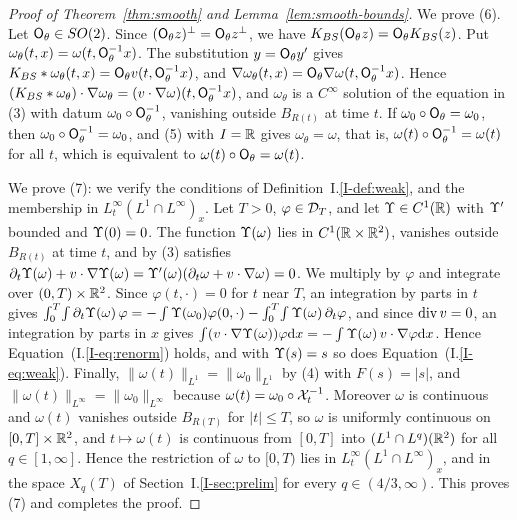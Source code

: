 \begin{proof}[Proof of Theorem~\ref{thm:smooth} and Lemma~\ref{lem:smooth-bounds}]
We prove (6). Let $\mathsf{O}_\theta\in SO(2)$. Since $(\mathsf{O}_\theta z)^\perp=\mathsf{O}_\theta z^\perp$,
we have $K_{BS}(\mathsf{O}_\theta z)=\mathsf{O}_\theta K_{BS}(z)$. Put
$\omega_\theta(t,x)=\omega(t,\mathsf{O}_\theta^{-1}x)$. The substitution
$y=\mathsf{O}_\theta y'$ gives
$K_{BS}\ast\omega_\theta(t,x)=\mathsf{O}_\theta v(t,\mathsf{O}_\theta^{-1}x)$, and
$\nabla\omega_\theta(t,x)=\mathsf{O}_\theta\nabla\omega(t,\mathsf{O}_\theta^{-1}x)$. Hence
$(K_{BS}\ast\omega_\theta)\cdot\nabla\omega_\theta=(v\cdot\nabla\omega)(t,\mathsf{O}_\theta^{-1}x)$,
and $\omega_\theta$ is a $C^\infty$ solution of the equation in (3) with datum
$\omega_0\circ\mathsf{O}_\theta^{-1}$, vanishing outside $B_{R(t)}$ at time $t$. If
$\omega_0\circ\mathsf{O}_\theta=\omega_0$, then $\omega_0\circ\mathsf{O}_\theta^{-1}=\omega_0$,
and (5) with $I=\mathbb{R}$ gives $\omega_\theta=\omega$, that is,
$\omega(t)\circ\mathsf{O}_\theta^{-1}=\omega(t)$ for all $t$, which is equivalent to
$\omega(t)\circ\mathsf{O}_\theta=\omega(t)$.

We prove (7): we verify the conditions of
Definition~I.\ref{I-def:weak}, and the membership in $L^\infty_t(L^1\cap L^\infty)_x$. Let $T>0$, $\varphi\in\mathcal{D}_T$, and let $\Upsilon\in C^1(\mathbb{R})$ with
$\Upsilon'$ bounded and $\Upsilon(0)=0$. The function $\Upsilon(\omega)$ lies in
$C^1(\mathbb{R}\times\mathbb{R}^2)$, vanishes outside $B_{R(t)}$ at time $t$, and by (3)
satisfies $\partial_t\Upsilon(\omega)+v\cdot\nabla\Upsilon(\omega)=\Upsilon'(\omega)(\partial_t\omega+v\cdot\nabla\omega)=0$.
We multiply by $\varphi$ and integrate over $(0,T)\times\mathbb{R}^2$. Since
$\varphi(t,\cdot)=0$ for $t$ near $T$, an integration by parts in $t$ gives
$\int_0^T\!\int\partial_t\Upsilon(\omega)\,\varphi=-\int\Upsilon(\omega_0)\varphi(0,\cdot)-\int_0^T\!\int\Upsilon(\omega)\,\partial_t\varphi$,
and since $\operatorname{div} v=0$, an integration by parts in $x$ gives
$\int(v\cdot\nabla\Upsilon(\omega))\varphi\dd x=-\int\Upsilon(\omega)\,v\cdot\nabla\varphi\dd x$.
Hence Equation~(I.\ref{I-eq:renorm}) holds, and with $\Upsilon(s)=s$ so does
Equation~(I.\ref{I-eq:weak}). Finally, $\|\omega(t)\|_{L^1}=\|\omega_0\|_{L^1}$ by
(4) with $F(s)=|s|$, and $\|\omega(t)\|_{L^\infty}=\|\omega_0\|_{L^\infty}$
because $\omega(t)=\omega_0\circ\mathcal{X}_t^{-1}$. Moreover $\omega$ is continuous and
$\omega(t)$ vanishes outside $B_{R(T)}$ for $|t|\le T$, so $\omega$ is uniformly
continuous on $[0,T]\times\mathbb{R}^2$, and $t\mapsto\omega(t)$ is continuous from
$[0,T]$ into $(L^1\cap L^q)(\mathbb{R}^2)$ for all $q\in[1,\infty]$. Hence the
restriction of $\omega$ to $[0,T)$ lies in $L^\infty_t(L^1\cap L^\infty)_x$, and
in the space $X_q(T)$ of Section~I.\ref{I-sec:prelim} for every
$q\in(4/3,\infty)$. This proves (7) and completes the
proof.
\end{proof}
